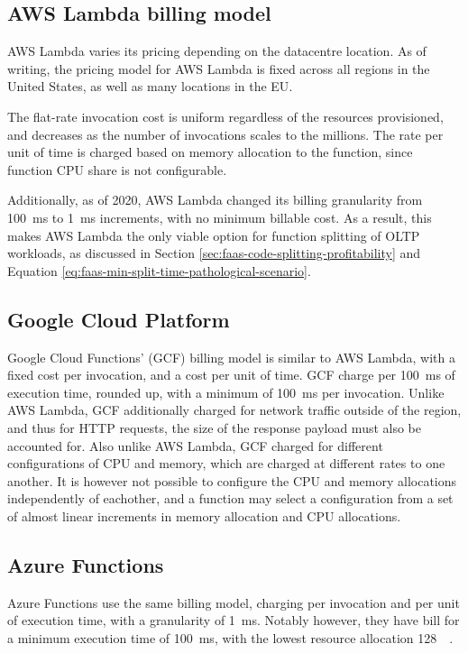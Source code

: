 \subsection{AWS Lambda billing model}
AWS Lambda varies its pricing depending on the datacentre location. As of writing, the pricing model for AWS Lambda is fixed across all regions in the United States, as well as many locations in the EU\cite{ServerlessComputingAWS}.

The flat-rate invocation cost is uniform regardless of the resources provisioned, and decreases as the number of invocations scales to the millions. The rate per unit of time is charged based on memory allocation to the function, since function CPU share is not configurable.

Additionally, as of 2020, AWS Lambda changed its billing granularity from \SI{100}{\milli\second} to \SI{1}{\milli\second}\cite{AWSLambdaChanges} increments, with no minimum billable cost. As a result, this makes AWS Lambda the only viable option for function splitting of OLTP workloads, as discussed in Section \ref{sec:faas-code-splitting-profitability} and Equation \ref{eq:faas-min-split-time-pathological-scenario}.

\subsection{Google Cloud Platform}
Google Cloud Functions' (GCF) billing model is similar to AWS Lambda, with a fixed cost per invocation, and a cost per unit of time. GCF charge per \SI{100}{\milli\second} of execution time, rounded up, with a minimum of \SI{100}{\milli\second} per invocation\cite{PricingCloudFunctions}. Unlike AWS Lambda, GCF additionally charged for network traffic outside of the region, and thus for HTTP requests, the size of the response payload must also be accounted for. Also unlike AWS Lambda, GCF charged for different configurations of CPU and memory, which are charged at different rates to one another. It is however not possible to configure the CPU and memory allocations independently of eachother, and a function may select a configuration from a set of almost linear increments in memory allocation and CPU allocations.

\subsection{Azure Functions}
Azure Functions use the same billing model, charging per invocation and per unit of execution time, with a granularity of \SI{1}{\milli\second}\cite{PricingFunctionsMicrosoft}. Notably however, they have bill for a minimum execution time of \SI{100}{\milli\second}, with the lowest resource allocation \SI{128}{\mega\byte}.

